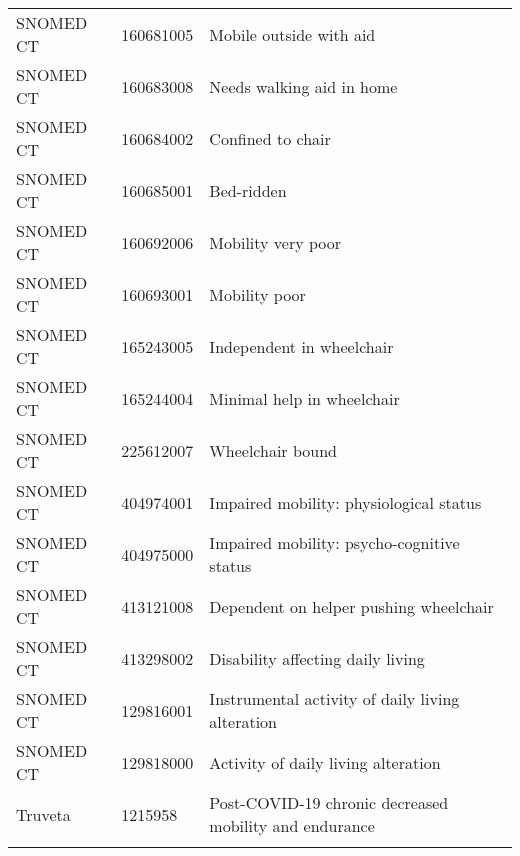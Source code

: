 \begin{longtable}{p{}p{}p{}}
  SNOMED CT & 160681005 & Mobile outside with aid \\ 
  SNOMED CT & 160683008 & Needs walking aid in home \\ 
  SNOMED CT & 160684002 & Confined to chair \\ 
  SNOMED CT & 160685001 & Bed-ridden \\ 
  SNOMED CT & 160692006 & Mobility very poor \\ 
  SNOMED CT & 160693001 & Mobility poor \\ 
  SNOMED CT & 165243005 & Independent in wheelchair \\ 
  SNOMED CT & 165244004 & Minimal help in wheelchair \\ 
  SNOMED CT & 225612007 & Wheelchair bound \\ 
  SNOMED CT & 404974001 & Impaired mobility: physiological status \\ 
  SNOMED CT & 404975000 & Impaired mobility: psycho-cognitive status \\ 
  SNOMED CT & 413121008 & Dependent on helper pushing wheelchair \\ 
  SNOMED CT & 413298002 & Disability affecting daily living \\ 
  SNOMED CT & 129816001 & Instrumental activity of daily living alteration \\ 
  SNOMED CT & 129818000 & Activity of daily living alteration \\ 
  Truveta & 1215958 & Post-COVID-19 chronic decreased mobility and endurance \\ 
  \hline
\label{tab:codes_impaired_daily_function}
\end{longtable}

